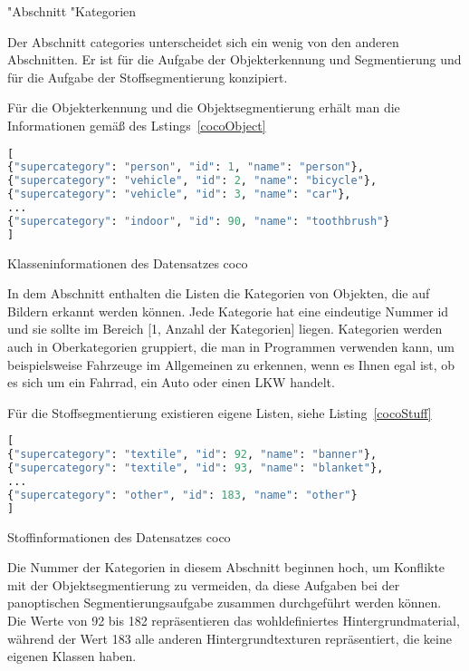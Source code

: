 \bigskip

"Abschnitt "Kategorien

Der Abschnitt categories unterscheidet sich ein wenig von den anderen Abschnitten. Er ist für die Aufgabe der Objekterkennung und Segmentierung und für die Aufgabe der Stoffsegmentierung konzipiert.

Für die Objekterkennung und die Objektsegmentierung erhält man die Informationen gemäß des Lstings~\ref{cocoObject}

\begin{code}
    \begin{lstlisting}[language=python]
[
{"supercategory": "person", "id": 1, "name": "person"},
{"supercategory": "vehicle", "id": 2, "name": "bicycle"},
{"supercategory": "vehicle", "id": 3, "name": "car"},
...
{"supercategory": "indoor", "id": 90, "name": "toothbrush"}
]
\end{lstlisting}

\caption{Klasseninformationen des Datensatzes \ac{coco}}\label{cocoObject}
\end{code}

In dem Abschnitt enthalten die Listen die Kategorien von Objekten, die auf Bildern erkannt werden können. Jede Kategorie hat eine eindeutige Nummer id und sie sollte im Bereich [1, Anzahl der Kategorien] liegen. Kategorien werden auch in Oberkategorien gruppiert, die man in Programmen verwenden kann, um beispielsweise Fahrzeuge im Allgemeinen zu erkennen, wenn es Ihnen egal ist, ob es sich um ein Fahrrad, ein Auto oder einen LKW handelt.

\bigskip

Für die Stoffsegmentierung existieren eigene Listen, siehe Listing~\ref{cocoStuff}

\begin{code}
\begin{lstlisting}[language=python]
[
{"supercategory": "textile", "id": 92, "name": "banner"},
{"supercategory": "textile", "id": 93, "name": "blanket"},
...
{"supercategory": "other", "id": 183, "name": "other"}
]
\end{lstlisting}
\caption{Stoffinformationen des Datensatzes \ac{coco}}\label{cocoStuff}
\end{code}

Die Nummer der Kategorien in diesem Abschnitt beginnen hoch, um Konflikte mit der Objektsegmentierung zu vermeiden, da diese Aufgaben bei der panoptischen Segmentierungsaufgabe zusammen durchgeführt werden können. Die Werte von 92 bis 182 repräsentieren das wohldefiniertes  Hintergrundmaterial, während der Wert 183 alle anderen Hintergrundtexturen repräsentiert, die keine eigenen Klassen haben.

